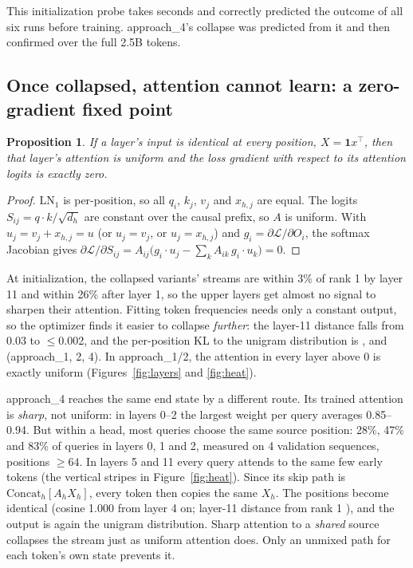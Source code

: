 \documentclass[11pt]{article}
\newtheorem{prop}{Proposition}
\newcommand{\cat}{\mathrm{Concat}_h}
\begin{document}
This initialization probe takes seconds and correctly predicted the outcome of all six runs before
training. approach\_4's collapse was predicted from it and then confirmed over the full 2.5B tokens.

\subsection{Once collapsed, attention cannot learn: a zero-gradient fixed point}
\begin{prop}
If a layer's input is identical at every position, $X=\mathbf 1x^\top$, then that layer's attention is
uniform and the loss gradient with respect to its attention logits is exactly zero.
\end{prop}
\begin{proof}
$\mathrm{LN}_1$ is per-position, so all $q_i$, $k_j$, $v_j$ and $x_{h,j}$ are equal. The logits
$S_{ij}=q\cdot k/\sqrt{d_h}$ are constant over the causal prefix, so $A$ is uniform. With $u_j=v_j+x_{h,j}=u$
(or $u_j = v_j$, or $u_j = x_{h,j}$) and $g_i=\partial\mathcal L/\partial O_i$, the softmax Jacobian gives
$\partial\mathcal L/\partial S_{ij}=A_{ij}\big(g_i\cdot u_j-\sum_k A_{ik}\,g_i\cdot u_k\big)=0$.
\end{proof}
At initialization, the collapsed variants' streams are within 3\% of rank 1 by layer 11 and within 26\% after
layer 1, so the upper layers get almost no signal to sharpen their attention. Fitting token frequencies needs only
a constant output, so the optimizer finds it easier to collapse \emph{further}: the layer-11 distance falls from
0.03 to $\le$0.002, and the per-position KL to the unigram distribution is \OneKL, \TwoKL{} and \FourKL{}
(approach\_1, 2, 4). In approach\_1/2, the attention in every layer above 0 is exactly uniform
(Figures~\ref{fig:layers} and \ref{fig:heat}).

approach\_4 reaches the same end state by a different route. Its trained attention is \emph{sharp}, not
uniform: in layers 0--2 the largest weight per query averages 0.85--0.94. But within a head, most queries
choose the same source position: 28\%, 47\% and 83\% of queries in layers 0, 1 and 2, measured on 4 validation
sequences, positions $\ge 64$. In layers 5 and 11 every query attends to the same few early tokens (the
vertical stripes in Figure~\ref{fig:heat}). Since its skip path is $\cat[A_hX_h]$, every token then copies
the same $X_h$. The positions become identical (cosine 1.000 from layer 4 on; layer-11 distance from rank 1
\FourTrRank), and the output is again the unigram distribution. Sharp attention to a \emph{shared} source
collapses the stream just as uniform attention does. Only an unmixed path for each token's own state prevents
it.
\end{document}
